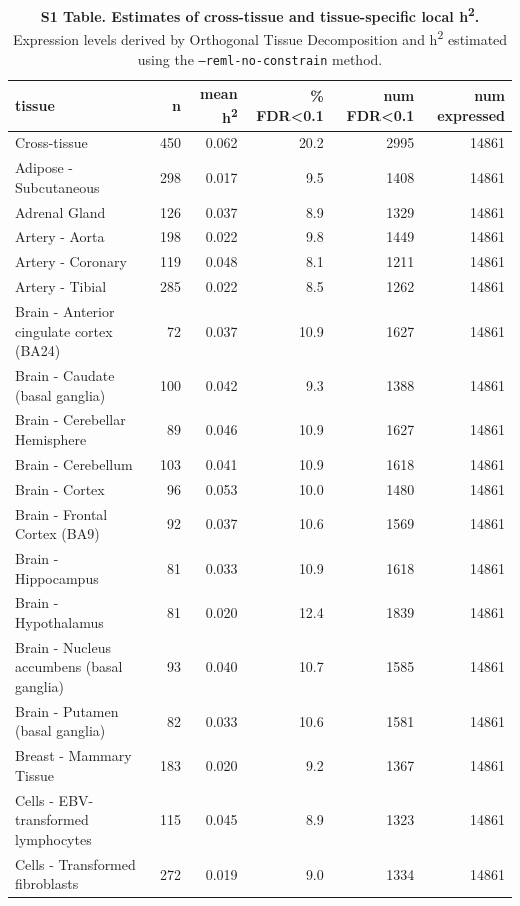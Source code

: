 \documentclass[10pt,letterpaper]{article}
\begin{document}
\begin{table}[!ht]
\begin{adjustwidth}{-2.25in}{0in} %
\caption*{{\bf S1 Table. Estimates of cross-tissue and tissue-specific local h\textsuperscript{2}.} Expression levels derived by Orthogonal Tissue Decomposition and h\textsuperscript{2} estimated using the \texttt{--reml-no-constrain} method.}
\centering
\begin{tabular}{lrrrrr}
  \hline
tissue & n & mean h\textsuperscript{2} & \% FDR\textless{}0.1 & num FDR\textless{}0.1 & num expressed \\ 
  \hline
Cross-tissue & 450 & 0.062 & 20.2 & 2995 & 14861 \\ 
  Adipose - Subcutaneous & 298 & 0.017 & 9.5 & 1408 & 14861 \\ 
  Adrenal Gland & 126 & 0.037 & 8.9 & 1329 & 14861 \\ 
  Artery - Aorta & 198 & 0.022 & 9.8 & 1449 & 14861 \\ 
  Artery - Coronary & 119 & 0.048 & 8.1 & 1211 & 14861 \\ 
  Artery - Tibial & 285 & 0.022 & 8.5 & 1262 & 14861 \\ 
  Brain - Anterior cingulate cortex (BA24) & 72 & 0.037 & 10.9 & 1627 & 14861 \\ 
  Brain - Caudate (basal ganglia) & 100 & 0.042 & 9.3 & 1388 & 14861 \\ 
  Brain - Cerebellar Hemisphere & 89 & 0.046 & 10.9 & 1627 & 14861 \\ 
  Brain - Cerebellum & 103 & 0.041 & 10.9 & 1618 & 14861 \\ 
  Brain - Cortex & 96 & 0.053 & 10.0 & 1480 & 14861 \\ 
  Brain - Frontal Cortex (BA9) & 92 & 0.037 & 10.6 & 1569 & 14861 \\ 
  Brain - Hippocampus & 81 & 0.033 & 10.9 & 1618 & 14861 \\ 
  Brain - Hypothalamus & 81 & 0.020 & 12.4 & 1839 & 14861 \\ 
  Brain - Nucleus accumbens (basal ganglia) & 93 & 0.040 & 10.7 & 1585 & 14861 \\ 
  Brain - Putamen (basal ganglia) & 82 & 0.033 & 10.6 & 1581 & 14861 \\ 
  Breast - Mammary Tissue & 183 & 0.020 & 9.2 & 1367 & 14861 \\ 
  Cells - EBV-transformed lymphocytes & 115 & 0.045 & 8.9 & 1323 & 14861 \\ 
  Cells - Transformed fibroblasts & 272 & 0.019 & 9.0 & 1334 & 14861 \\ 

\end{tabular}
\end{adjustwidth}
\end{table}
\end{document}
